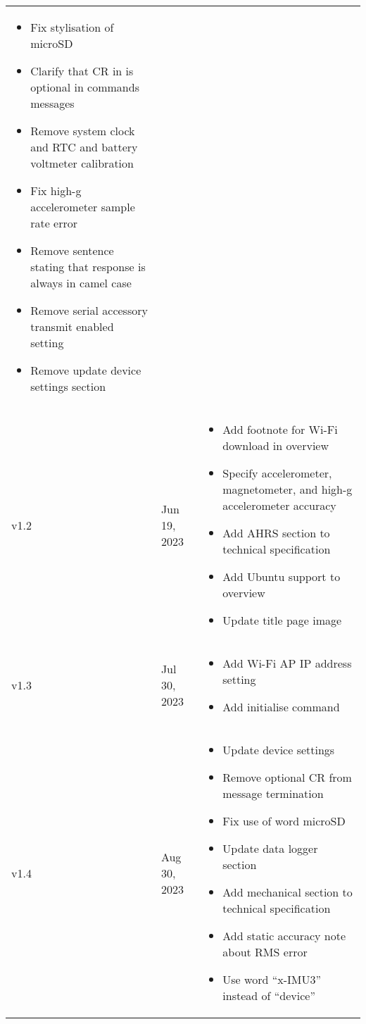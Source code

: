 \begin{longtable}{| >{\centering}p{} | p{} | >{\raggedright\arraybackslash}p{} |}
\begin{itemize}
            \item Fix stylisation of \ac{microSD}
            \item Clarify that CR in is optional in commands messages
            \item Remove system clock and \ac{RTC} and battery voltmeter calibration
            \item Fix high-g accelerometer sample rate error
            \item Remove sentence stating that response is always in camel case
            \item Remove serial accessory transmit enabled setting
            \item Remove update device settings section
        \end{itemize}\\
        v1.2 & Jun 19, 2023 &
        \begin{itemize}
            \item Add footnote for Wi-Fi download in overview
            \item Specify accelerometer, magnetometer, and high-g accelerometer accuracy
            \item Add AHRS section to technical specification
            \item Add Ubuntu support to overview
            \item Update title page image
        \end{itemize}\\
        v1.3 & Jul 30, 2023 &
        \begin{itemize}
            \item Add Wi-Fi \ac{AP} \ac{IP} address setting
            \item Add initialise command
        \end{itemize}\\
        v1.4 & Aug 30, 2023 &
        \begin{itemize}
            \item Update device settings
            \item Remove optional CR from message termination
            \item Fix use of word \ac{microSD}
            \item Update data logger section
            \item Add mechanical section to technical specification
            \item Add static accuracy note about \acs{RMS} error
            \item Use word \enquote{x-IMU3} instead of \enquote{device}

\end{itemize}
\end{longtable}
